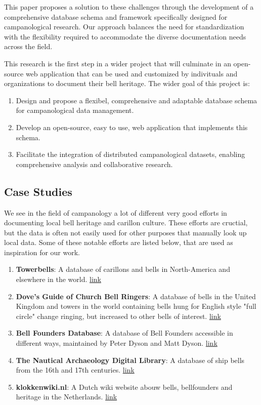 \documentclass[11pt, a4paper]{article}
\begin{document}
This paper proposes a solution to these challenges through the development of a comprehensive database schema and framework specifically designed for campanological research. Our approach balances the need for standardization with the flexibility required to accommodate the diverse documentation needs across the field.

This research is the first step in a wider project that will culminate in an open-source web application that can be used and customized by indivituals and organizations to document their bell heritage. The wider goal of this project is:

\begin{enumerate}
    \item Design and propose a flexibel, comprehensive and adaptable database schema for campanological data management.
    \item Develop an open-source, easy to use, web application that implements this schema.
    \item Facilitate the integration of distributed campanological datasets, enabling comprehensive analysis and collaborative research.
\end{enumerate}

\subsection{Case Studies}

We see in the field of campanology a lot of different very good efforts in documenting local bell heritage and carillon culture. These efforts are cructial, but the data is often not easily used for other purposes that manually look up local data. Some of these notable efforts are listed below, that are used as inspiration for our work.

\begin{enumerate}
    \item \textbf{Towerbells}: A database of carillons and bells in North-America and elsewhere in the world. \href{https://www.towerbells.org/}{link}
    \item \textbf{Dove's Guide of Church Bell Ringers}: A database of bells in the United Kingdom and towers in the world containing bells hung for English style "full circle" change ringing, but increased to other bells of interest. \href{https://dove.cccbr.org.uk/}{link}
    \item \textbf{Bell Founders Database}: A database of Bell Founders accessible in different ways, maintained by Peter Dyson and Matt Dyson. \href{https://www.bellfounders.net}{link}
    \item \textbf{The Nautical Archaeology Digital Library}: A database of ship bells from the 16th and 17th centuries. \href{https://shiplib.org/index.php/collections/artifact-collections/early-ship-bells-database/}{link} 
    \item \textbf{klokkenwiki.nl}: A Dutch wiki website abouw bells, bellfounders and heritage in the Netherlands. \href{https://www.klokkenwiki.nl}{link}
\end{enumerate}
\end{document}
